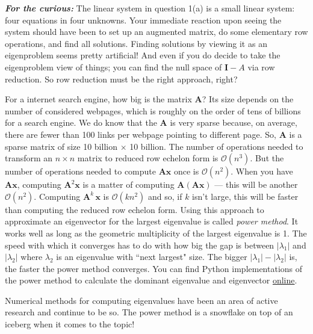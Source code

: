 \documentclass[10pt,answers]{exam}
\newcommand{\bA}{ \mathbf{A}}
\newcommand{\bx}{ \mathbf{x}}
\begin{document}
\begin{questions}
\begin{parts}
\end{parts}


\begin{EnvUplevel}  
  \textit{\textbf{For the curious:}} The linear system in question 1(a) is a
  small linear system: four equations in four unknowns.  Your immediate reaction
  upon seeing the system should have been to set up an augmented matrix, do some
  elementary row operations, and find all solutions.  Finding solutions by
  viewing it as an eigenproblem seems pretty artificial!  And even if you do
  decide to take the eigenproblem view of things; you can find the null space of
  $ \mathbf{I} - A$ via row reduction.  So row reduction must be the right
  approach, right?
   
  For a internet search engine, how big is the matrix $\mathbf{A}$?  Its size
  depends on the number of considered webpages, which is roughly on the order of
  tens of billions for a search engine.  We do know that the $\textbf{A}$ is
  very sparse because, on average, there are fewer than 100 links per webpage
  pointing to different page. So, $\bA$ is a sparse matrix of size 10 billion
  $\times$ 10 billion. The number of operations needed to transform an
  $n \times n$ matrix to reduced row echelon form is $\mathcal{O}(n^3)$.  But
  the number of operations needed to compute $\bA \bx$ once is
  $\mathcal{O}(n^2)$.  When you have $\bA \bx$, computing $\bA^2 \bx$ is a
  matter of computing $\bA (\bA \bx)$ --- this will be another
  $\mathcal{O}(n^2)$.  Computing $\bA^k \, \bx$ is $\mathcal{O}(k n^2)$ and so,
  if $k$ isn't large, this will be faster than computing the reduced row echelon
  form.  Using this approach to approximate an eigenvector for the largest
  eigenvalue is called \textit{power method}.  It works well as long as the
  geometric multiplicity of the largest eigenvalue is 1.  The speed with which
  it converges has to do with how big the gap is between $|\lambda_1|$ and
  $|\lambda_2|$ where $\lambda_2$ is an eigenvalue with ``next largest" size.
  The bigger $|\lambda_1| - |\lambda_2|$ is, the faster the power method
  converges.  You can find Python implementations of the power method to
  calculate the dominant eigenvalue and eigenvector
  \href{https://www.geeksforgeeks.org/power-method-determine-largest-eigenvalue-and-eigenvector-in-python/}{online}.
    
  Numerical methods for computing eigenvalues have been an area of active
  research and continue to be so.  The power method is a snowflake on top of an
  iceberg when it comes to the topic!
    

\end{EnvUplevel}
\end{questions}
\end{document}
